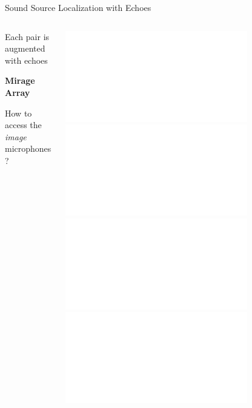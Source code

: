 \begin{frame}[t]{Sound Source Localization \alert{with Echoes} \hfill\faMapMarked*}
\begin{columns}[T,onlytextwidth]
\begin{column}{0.5\textwidth}
        \end{column}
    \end{columns}

    \pause[3]
    \vfill
    \begin{columns}[T,onlytextwidth]

        \begin{column}{0.5\textwidth}
            \begin{block}{Each pair is augmented with echoes}
                \begin{center}
                    \textcolor{myred}{\textbf{Mirage Array}}
                    \\
                \end{center}
            How to access the \textit{image} microphones?
            \end{block}
        \end{column}

        \begin{column}{0.5\textwidth}
            \centering
            \includegraphics<2-4>[width=\textwidth]{figures/rirs1.pdf}%
            \includegraphics<5>[width=\textwidth]{figures/rirs2.pdf}%
            \includegraphics<6>[width=\textwidth]{figures/rirs3.pdf}%
            \includegraphics<7->[width=\textwidth]{figures/rirs4.pdf}%
        \end{column}
    \end{columns}


\end{frame}

